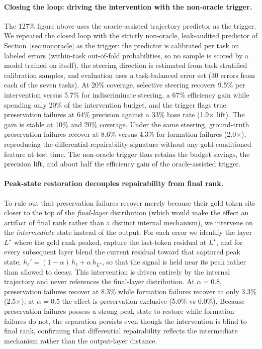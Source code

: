 \documentclass{article} %
\begin{document}
\paragraph{Closing the loop: driving the intervention with the non-oracle trigger.}
The 127\% figure above uses the oracle-assisted trajectory predictor as the trigger. We repeated the closed loop with the strictly non-oracle, leak-audited predictor of Section~\ref{sec:nonoracle} as the trigger: the predictor is calibrated per task on labeled errors (within-task out-of-fold probabilities, so no sample is scored by a model trained on itself), the steering direction is estimated from task-stratified calibration samples, and evaluation uses a task-balanced error set (30 errors from each of the seven tasks). At 20\% coverage, selective steering recovers 9.5\% per intervention versus 5.7\% for indiscriminate steering, a 67\% efficiency gain while spending only 20\% of the intervention budget, and the trigger flags true preservation failures at 64\% precision against a 33\% base rate (1.9$\times$ lift). The gain is stable at 10\% and 20\% coverage. Under the same steering, ground-truth preservation failures recover at 8.6\% versus 4.3\% for formation failures (2.0$\times$), reproducing the differential-repairability signature without any gold-conditioned feature at test time. The non-oracle trigger thus retains the budget savings, the precision lift, and about half the efficiency gain of the oracle-assisted trigger.

\paragraph{Peak-state restoration decouples repairability from final rank.}
To rule out that preservation failures recover merely because their gold token sits closer to the top of the \emph{final-layer} distribution (which would make the effect an artifact of final rank rather than a distinct internal mechanism), we intervene on the \emph{intermediate} state instead of the output. For each error we identify the layer $L^\star$ where the gold rank peaked, capture the last-token residual at $L^\star$, and for every subsequent layer blend the current residual toward that captured peak state, $h_\ell' = (1-\alpha)\,h_\ell + \alpha\,h_{L^\star}$, so that the signal is held near its peak rather than allowed to decay. This intervention is driven entirely by the internal trajectory and never references the final-layer distribution. At $\alpha = 0.8$, preservation failures recover at 8.3\% while formation failures recover at only 3.3\% (2.5$\times$); at $\alpha = 0.5$ the effect is preservation-exclusive (5.0\% vs 0.0\%). Because preservation failures possess a strong peak state to restore while formation failures do not, the separation persists even though the intervention is blind to final rank, confirming that differential repairability reflects the intermediate mechanism rather than the output-layer distance.
\end{document}
